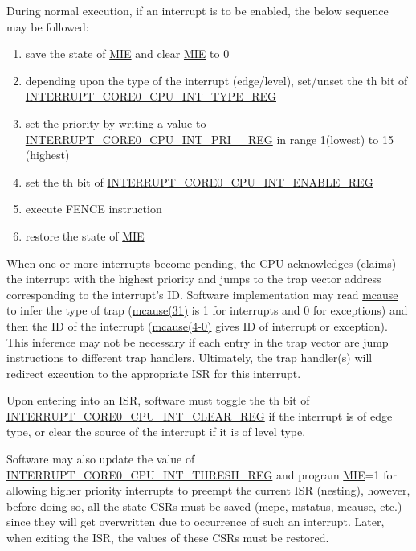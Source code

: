 \documentclass[main\_\_EN.tex]{subfiles}
\begin{document}
During normal execution, if an interrupt  is to be enabled, the below sequence may be followed:
\begin{enumerate}
    \item save the state of \hyperref[fielddesc:MSTATUSMIE]{MIE} and clear \hyperref[fielddesc:MSTATUSMIE]{MIE} to 0 
    \item depending upon the type of the interrupt (edge/level), set/unset the th bit of \hyperref[regdesc:INTERRUPTCORE0CPUINTTYPEREG]{INTERRUPT\_CORE0\_CPU\_INT\_TYPE\_REG}
    \item set the priority by writing a value to \hyperref[regdesc:INTERRUPTCORE0CPUINTPRI0REG]{INTERRUPT\_CORE0\_CPU\_INT\_PRI\_\_REG} in range 1(lowest) to 15 (highest)
    \item set the th bit of \hyperref[regdesc:INTERRUPTCORE0CPUINTENABLEREG]{INTERRUPT\_CORE0\_CPU\_INT\_ENABLE\_REG}
    \item execute FENCE instruction
    \item restore the state of \hyperref[fielddesc:MSTATUSMIE]{MIE}
\end{enumerate}

When one or more interrupts become pending, the CPU acknowledges (claims) the interrupt with the highest priority and jumps to the trap vector address corresponding to the interrupt's ID. Software implementation may read \hyperref[regdesc:MCAUSE]{mcause} to infer the type of trap (\hyperref[fielddesc:MCAUSEINT]{mcause(31)} is 1 for interrupts and 0 for exceptions) and then the ID of the interrupt (\hyperref[fielddesc:MCAUSECODE]{mcause(4-0)} gives ID of interrupt or exception). This inference may not be necessary if each entry in the trap vector are jump instructions to different trap handlers. Ultimately, the trap handler(s) will redirect execution to the appropriate ISR for this interrupt.

Upon entering into an ISR, software must toggle the th bit of \hyperref[regdesc:INTERRUPTCORE0CPUINTCLEARREG]{INTERRUPT\_CORE0\_CPU\_INT\_CLEAR\_REG} if the interrupt is of edge type, or clear the source of the interrupt if it is of level type.

Software may also update the value of \hyperref[regdesc:INTERRUPTCORE0CPUINTTHRESHREG]{INTERRUPT\_CORE0\_CPU\_INT\_THRESH\_REG} and program \hyperref[fielddesc:MSTATUSMIE]{MIE}=1 for allowing higher priority interrupts to preempt the current ISR (nesting), however, before doing so, all the state CSRs must be saved (\hyperref[regdesc:MEPC]{mepc}, \hyperref[regdesc:MSTATUS]{mstatus}, \hyperref[regdesc:MCAUSE]{mcause}, etc.) since they will get overwritten due to occurrence of such an interrupt. Later, when exiting the ISR, the values of these CSRs must be restored.
\end{document}
